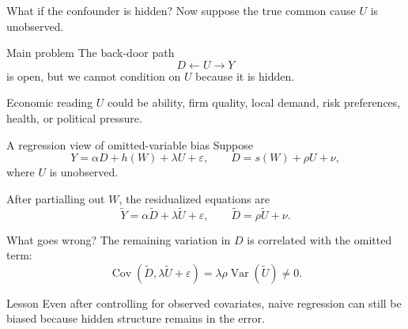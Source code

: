 \documentclass[dvipsnames,aspectratio=169,handout]{beamer}
\newcommand{\Var}{\operatorname{Var}}
\newcommand{\Cov}{\operatorname{Cov}}
\begin{document}
\begin{frame}{What if the confounder is hidden?}
Now suppose the true common cause $U$ is unobserved.

\begin{center}
\end{center}

\begin{alertblock}{Main problem}
The back-door path
\[
D \leftarrow U \rightarrow Y
\]
is open, but we cannot condition on $U$ because it is hidden.
\end{alertblock}

\begin{block}{Economic reading}
$U$ could be ability, firm quality, local demand, risk preferences, health, or political pressure.
\end{block}
\end{frame}

\begin{frame}{A regression view of omitted-variable bias}
Suppose
\[
Y = \alpha D + h(W) + \lambda U + \varepsilon,
\qquad
D = s(W) + \rho U + \nu,
\]
where $U$ is unobserved.

After partialling out $W$, the residualized equations are
\[
\widetilde Y = \alpha \widetilde D + \lambda \widetilde U + \varepsilon,
\qquad
\widetilde D = \rho \widetilde U + \nu.
\]

\begin{alertblock}{What goes wrong?}
The remaining variation in $D$ is correlated with the omitted term:
\[
\Cov(\widetilde D,\lambda \widetilde U + \varepsilon)
= \lambda \rho \Var(\widetilde U)\neq 0.
\]
\end{alertblock}

\begin{block}{Lesson}
Even after controlling for observed covariates, naive regression can still be biased because hidden structure remains in the error.
\end{block}
\end{frame}
\end{document}
